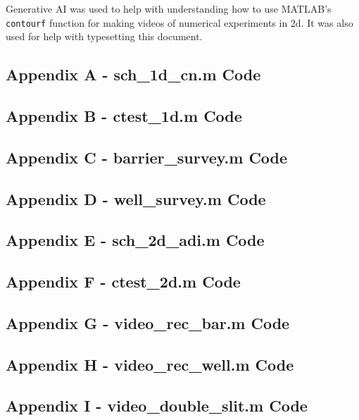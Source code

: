 \documentclass[10pt]{article}
\def\code#1{\texttt{#1}} %
\begin{document}

Generative AI was used to help with understanding how to use MATLAB's \code{contourf} function for 
making videos of numerical experiments in 2d. It was also used for help with typesetting this 
document.

\pagebreak


\subsection*{Appendix A - sch\_1d\_cn.m Code}

\pagebreak

\subsection*{Appendix B - ctest\_1d.m Code}

\pagebreak

\subsection*{Appendix C - barrier\_survey.m Code}

\pagebreak

\subsection*{Appendix D - well\_survey.m Code}

\pagebreak

\subsection*{Appendix E - sch\_2d\_adi.m Code}

\pagebreak

\subsection*{Appendix F - ctest\_2d.m Code}

\pagebreak

\subsection*{Appendix G - video\_rec\_bar.m Code}

\pagebreak

\subsection*{Appendix H - video\_rec\_well.m Code}

\pagebreak

\subsection*{Appendix I - video\_double\_slit.m Code}

\pagebreak
\end{document}
